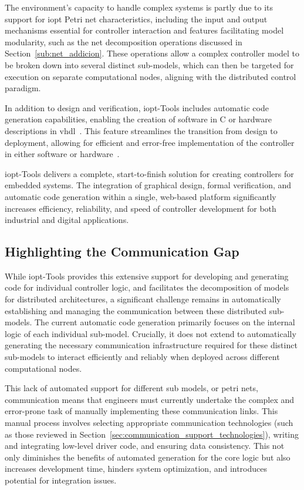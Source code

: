 The environment's capacity to handle complex systems is partly due to its support for \gls{iopt} Petri net characteristics, including the input and output mechanisms essential for controller interaction and features facilitating model modularity, such as the net decomposition operations discussed in Section~\ref{sub:net_addicion}. These operations allow a complex controller model to be broken down into several distinct sub-models, which can then be targeted for execution on separate computational nodes, aligning with the distributed control paradigm.


In addition to design and verification, \gls{iopt}-Tools includes automatic code generation capabilities, enabling the creation of software in C or hardware descriptions in \gls{vhdl}~\cite{vhld}. This feature streamlines the transition from design to deployment, allowing for efficient and error-free implementation of the controller in either software or hardware~\cite{manual}.

\gls{iopt}-Tools delivers a complete, start-to-finish solution for creating controllers for embedded systems. The integration of graphical design, formal verification, and automatic code generation within a single, web-based platform significantly increases efficiency, reliability, and speed of controller development for both industrial and digital applications.


\subsection{Highlighting the Communication Gap}
\label{subsec:communication_gap}

While \gls{iopt}-Tools provides this extensive support for developing and generating code for individual controller logic, and facilitates the decomposition of models for distributed architectures, a significant challenge remains in automatically establishing and managing the communication between these distributed sub-models. The current automatic code generation primarily focuses on the internal logic of each individual sub-model. Crucially, it does not extend to automatically generating the necessary communication infrastructure required for these distinct sub-models to interact efficiently and reliably when deployed across different computational nodes.

This lack of automated support for different sub models, or petri nets, communication means that engineers must currently undertake the complex and error-prone task of manually implementing these communication links. This manual process involves selecting appropriate communication technologies (such as those reviewed in Section~\ref{sec:communication_support_technologies}), writing and integrating low-level driver code, and ensuring data consistency. This not only diminishes the benefits of automated generation for the core logic but also increases development time, hinders system optimization, and introduces potential for integration issues.


